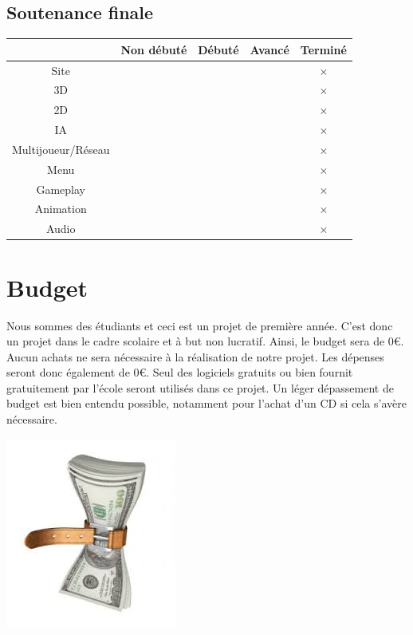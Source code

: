 \documentclass[a4paper, 12pt]{article}
\begin{document}
	\subsection{Soutenance finale}
	\begin{tabular}{|c||c|c|c|c|}
		\hline
		& Non débuté & Débuté & Avancé & Terminé \\
		\hline
		Site & & & & $\times$ \\
		\hline
		3D & & & & $\times$ \\
		\hline
		2D & & & & $\times$ \\
		\hline
		IA & & & & $\times$ \\
		\hline
		Multijoueur/Réseau & & & & $\times$ \\
		\hline
		Menu & & & & $\times$ \\
		\hline
		Gameplay & & & & $\times$\\
		\hline
		Animation & & & & $\times$\\		
		\hline
		Audio & & & & $\times$ \\
		\hline		
	\end{tabular}
\section{Budget}

Nous sommes des étudiants et ceci est un projet de première année. C'est donc un projet dans le cadre scolaire et à but non lucratif. Ainsi, le budget sera de 0\euro{}. Aucun achats ne sera nécessaire à la réalisation de notre projet. Les dépenses seront donc également de 0\euro{}. Seul des logiciels gratuits ou bien fournit gratuitement par l'école seront utilisés dans ce projet. Un léger dépassement de budget est bien entendu possible, notamment pour l'achat d'un CD si cela s'avère nécessaire.\\
\centerline{\includegraphics[scale=0.7]{images.jpg}}
\end{document}
